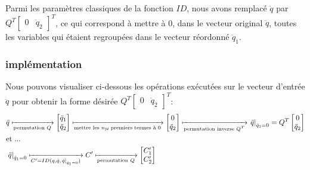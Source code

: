 \documentclass{report}
\begin{document}

Parmi les paramètres classiques de la fonction $ID$, nous avons remplacé $\ddot{q}$ par 
\(Q^T \begin{bmatrix} 0 & \ddot{q}_2 \end{bmatrix}^T\), 
ce qui correspond à mettre à 0, dans le vecteur original $\ddot{q}$, toutes les variables qui étaient regroupées dans le vecteur réordonné $\ddot{q}_1$.\\


\subsubsection{implémentation}

Nous pouvons visualiser ci-dessous les opérations exécutées sur le vecteur d'entrée $\ddot{q}$ pour obtenir la forme désirée \(Q^T \begin{bmatrix} 0 & \ddot{q}_2 \end{bmatrix}^T\):
\begin{align*}
&\ddot{q} \xmapsto[\textnormal{permutation $Q$}]{} 
\begin{bmatrix}
  \ddot{q}_1 \\
  \ddot{q}_2
\end{bmatrix}
\xmapsto[\textnormal{mettre les $n_{\emph{fd}}$ premiers termes à 0}]{} 
\begin{bmatrix}
  0 \\
  \ddot{q}_2
\end{bmatrix}
\xmapsto[\textnormal{permutation inverse $Q^T$}]{} 
\left. \ddot{q} \right\vert_{\ddot{q}_1=0} = Q^T
\begin{bmatrix}
  0 \\
  \ddot{q}_2
\end{bmatrix} \\
\medskip
&\textnormal{et ...} \\
&\left. \ddot{q} \right\vert_{\ddot{q}_1=0} \xmapsto[C'=ID(q,\dot{q},\left. \ddot{q} \right\vert_{\ddot{q}_1=0})]{} C'
\xmapsto[\textnormal{permutation $Q$}]{} 
\begin{bmatrix}
  C'_1 \\
  C'_2
\end{bmatrix}
\end{align*}
\end{document}
